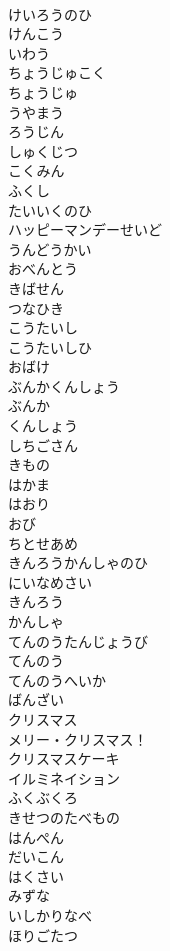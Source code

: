 \documentclass[8pt]{extreport}
\begin{document}
\begin{CJK}{UTF8}{min}
\\	けいろうのひ
\\	けんこう
\\	いわう
\\	ちょうじゅこく
\\	ちょうじゅ
\\	うやまう
\\	ろうじん
\\	しゅくじつ
\\	こくみん
\\	ふくし
\\	たいいくのひ
\\	ハッピーマンデーせいど
\\	うんどうかい
\\	おべんとう
\\	きばせん
\\	つなひき
\\	こうたいし
\\	こうたいしひ
\\	おばけ
\\	ぶんかくんしょう
\\	ぶんか
\\	くんしょう
\\	しちごさん
\\	きもの
\\	はかま
\\	はおり
\\	おび
\\	ちとせあめ
\\	きんろうかんしゃのひ
\\	にいなめさい
\\	きんろう
\\	かんしゃ
\\	てんのうたんじょうび
\\	てんのう
\\	てんのうへいか
\\	ばんざい
\\	クリスマス
\\	メリー・クリスマス！
\\	クリスマスケーキ
\\	イルミネイション
\\	ふくぶくろ
\\	きせつのたべもの
\\	はんぺん
\\	だいこん
\\	はくさい
\\	みずな
\\	いしかりなべ
\\	ほりごたつ

\end{CJK}
\end{document}
